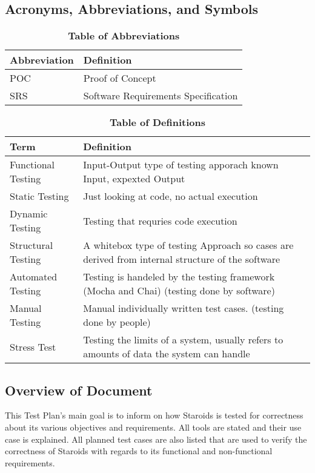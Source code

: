 \documentclass[12pt, titlepage]{article}
\begin{document}
\subsection{Acronyms, Abbreviations, and Symbols}

\begin{table}[hbp]
\caption{\textbf{Table of Abbreviations}} \label{Table}

\begin{tabularx}{\textwidth}{p{3cm}X}
\toprule
\textbf{Abbreviation} & \textbf{Definition} \\
\midrule
POC & Proof of Concept\\
SRS & Software Requirements Specification\\
\bottomrule
\end{tabularx}

\end{table}

\begin{table}[!htbp]
\caption{\textbf{Table of Definitions}} \label{Table}

\begin{tabularx}{\textwidth}{p{3cm}X}
\toprule
\textbf{Term} & \textbf{Definition}\\
\midrule
Functional Testing & Input-Output type of testing apporach known Input, expexted Output\\
Static Testing & Just looking at code, no actual execution\\
Dynamic Testing & Testing that requries code execution\\
Structural Testing & A whitebox type of testing Approach so cases are derived from internal structure of the software\\
Automated Testing & Testing is handeled by the testing framework (Mocha and Chai) (testing done by software)\\
Manual Testing & Manual individually written test cases. (testing done by people)\\
Stress Test & Testing the limits of a system, usually refers to amounts of data the system can handle\\
\bottomrule
\end{tabularx}

\end{table}

\subsection{Overview of Document}
This Test Plan's main goal is to inform on how Staroids is tested for correctness about its various objectives and requirements. All tools are stated and their use case is explained. All planned test cases are also listed that are used to verify the correctness of Staroids with regards to its functional and non-functional requirements.
\end{document}
